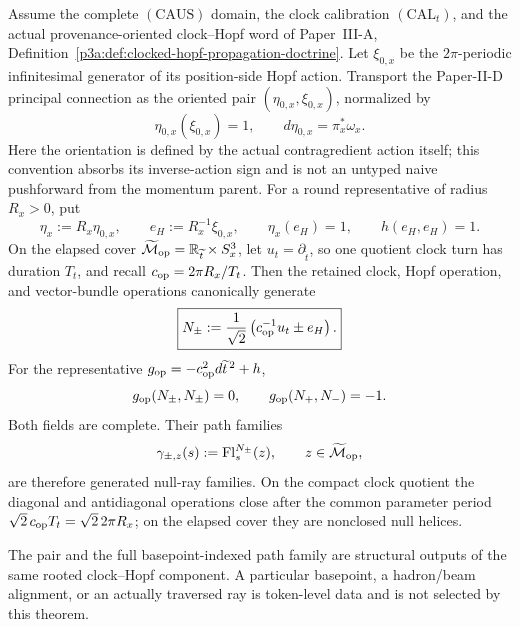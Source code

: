 \documentclass[12pt,a4paper]{article}
\begin{document}
\begin{theorem}
\label{p3e:thm:clock-hopf-null-ray-geometry}
Assume the complete \((\mathrm{CAUS})\) domain, the clock calibration
\((\mathrm{CAL}_t)\), and the actual provenance-oriented clock--Hopf word of
Paper~III-A, Definition~\ref{p3a:def:clocked-hopf-propagation-doctrine}.
Let \(\xi_{0,x}\) be the \(2\pi\)-periodic infinitesimal generator of its
position-side Hopf action.  Transport the Paper-II-D principal connection as
the oriented pair \((\eta_{0,x},\xi_{0,x})\), normalized by
\[
 \eta_{0,x}(\xi_{0,x})=1,
 \qquad d\eta_{0,x}=\pi_x^*\omega_x .
\]
Here the orientation is defined by the actual contragredient action itself;
this convention absorbs its inverse-action sign and is not an untyped naive
pushforward from the momentum parent.  For a round representative of radius
\(R_x>0\), put
\[
 \eta_x:=R_x\eta_{0,x},
 \qquad e_H:=R_x^{-1}\xi_{0,x},
 \qquad \eta_x(e_H)=1,
 \qquad h(e_H,e_H)=1 .
\]
On the elapsed cover
\(\widetilde{\mathcal M}_{\rm op}=\mathbb{R}_{\widetilde t}\times S_x^3\), let
\(u_t=\partial_{\widetilde t}\), so one quotient clock turn has duration
\(T_t\), and recall
\(c_{\rm op}=2\pi R_x/T_t\).  Then the retained clock, Hopf operation, and
vector-bundle operations canonically generate
\begin{equation}
\label{p3e:eq:clock-hopf-null-fields}
 \boxed{
 N_\pm:=\frac1{\sqrt2}
 \left(c_{\rm op}^{-1}u_t\pm e_H\right).}
\end{equation}
For the representative
\(g_{\rm op}=-c_{\rm op}^2d\widetilde t^{\,2}+h\),
\[
 g_{\rm op}(N_\pm,N_\pm)=0,
 \qquad g_{\rm op}(N_+,N_-)=-1.
\]
Both fields are complete.  Their path families
\begin{equation}
\label{p3e:eq:clock-hopf-null-path-family}
 \gamma_{\pm,z}(s):=\operatorname{Fl}^{N_\pm}_s(z),
 \qquad z\in\widetilde{\mathcal M}_{\rm op},
\end{equation}
are therefore generated null-ray families.  On the compact clock quotient
the diagonal and antidiagonal operations close after the common parameter
period \(\sqrt2\,c_{\rm op}T_t=\sqrt2\,2\pi R_x\); on the elapsed cover they
are nonclosed null helices.

The pair and the full basepoint-indexed path family are structural outputs of
the same rooted clock--Hopf component.  A particular basepoint, a hadron/beam
alignment, or an actually traversed ray is token-level data and is not
selected by this theorem.
\end{theorem}
\end{document}
